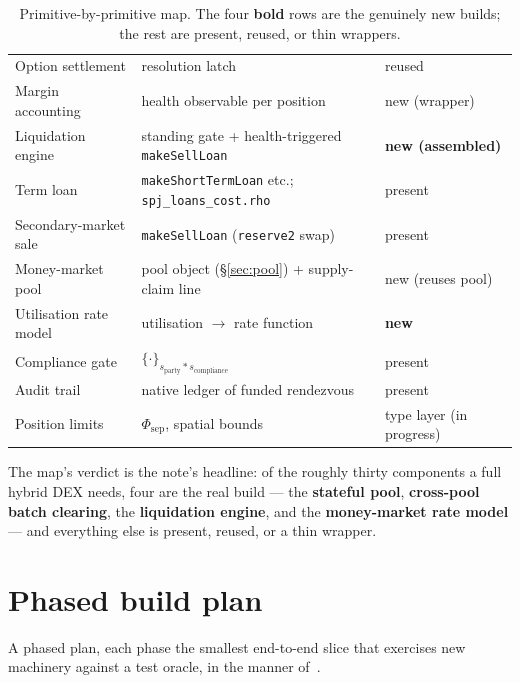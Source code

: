\documentclass[11pt]{article}
\theoremstyle{definition}
\newcommand{\Fsep}{\ensuremath{\Phi_{\mathrm{sep}}}}
\newcommand{\tensorsig}{\ensuremath{\ast}}
\begin{document}
\begin{table}[t]
\begin{tabular}{@{}p{}p{}p{}@{}}
Option settlement & resolution latch~\cite[\S7]{predmkt} & reused \\
Margin accounting & health observable per position & new (wrapper) \\
Liquidation engine & standing gate + health-triggered \texttt{makeSellLoan} & \textbf{new (assembled)} \\
Term loan & \texttt{makeShortTermLoan} etc.; \texttt{spj\_loans\_cost.rho} & present \\
Secondary-market sale & \texttt{makeSellLoan} (\texttt{reserve2} swap) & present \\
Money-market pool & pool object (\S\ref{sec:pool}) + supply-claim line & new (reuses pool) \\
Utilisation rate model & utilisation $\to$ rate function & \textbf{new} \\
Compliance gate & $\{\cdot\}_{s_{\text{party}} \tensorsig s_{\text{compliance}}}$~\cite[\S2.4]{cost} & present \\
Audit trail & native ledger of funded rendezvous~\cite[\S6]{finrho} & present \\
Position limits & $\Fsep$, spatial bounds~\cite[\S8]{finrho} & type layer (in progress) \\
\bottomrule
\end{tabular}
\caption{Primitive-by-primitive map. The four \textbf{bold} rows are the genuinely new builds; the
rest are present, reused, or thin wrappers.}
\label{tab:map}
\end{table}

The map's verdict is the note's headline: of the roughly thirty components a full hybrid DEX needs,
four are the real build --- the \textbf{stateful pool}, \textbf{cross-pool batch clearing}, the
\textbf{liquidation engine}, and the \textbf{money-market rate model} --- and everything else is
present, reused, or a thin wrapper.

\section{Phased build plan}\label{sec:roadmap}

A phased plan, each phase the smallest end-to-end slice that exercises new machinery against a test
oracle, in the manner of~\cite[\S8.1]{predmkt}.
\end{document}
